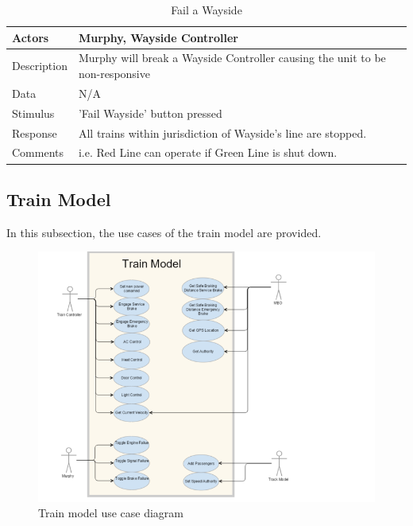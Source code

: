 \documentclass[]{article}
\begin{document}
\begin{table}[H]
	\centering
	\caption{Fail a Wayside}
	\begin{tabular}{|l|l|}
		\hline
		Actors & \parbox[t]{10cm}{Murphy, Wayside Controller} \\ \hline
		Description & \parbox[t]{10cm}{Murphy will break a Wayside Controller causing the unit to be non-responsive} \\ \hline
		Data &  \parbox[t]{10cm}{N/A} \\ \hline
		Stimulus &  \parbox[t]{10cm}{ 'Fail Wayside' button pressed} \\ \hline
		Response & \parbox[t]{10cm}{All trains within jurisdiction of Wayside's line are stopped.}\\ \hline
		Comments & \parbox[t]{10cm}{i.e. Red Line can operate if Green Line is shut down.}  \\ \hline
	\end{tabular}
\end{table}
\subsection{Train Model}
In this subsection, the use cases of the train model are provided.

\begin{figure}[H]
	\centering
	\includegraphics[scale=.5]{trainmodelusecase.png}
	\caption{Train model use case diagram}
\end{figure}
   
\end{document}
